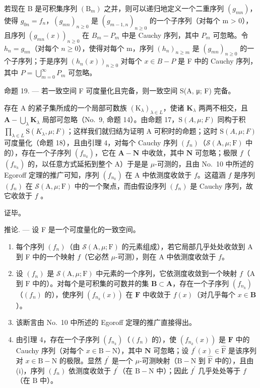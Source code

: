 若现在 B 是可积集序列 \((\mathrm{B}_{m})\) 之并，则可以递归地定义一个二重序列 \((g_{mn})\)，使得 \(g_{0n} = f_{n}\)，\((g_{mn})_{n \geqslant 0}\) 是 \((g_{m-1,n})_{n \geqslant 0}\) 的一个子序列（对每个 m \textgreater{} 0），且序列 \((g_{mn}(x))_{n \geqslant 0}\) 在 \(B_{m} - P_{m}\) 中是 Cauchy 序列，其中 \(P_{m}\) 可忽略。令 \(h_{n} = g_{nn}\)（对每个 \(n \geqslant 0\)），使得对每个 m，序列 \((h_{n})_{n \geqslant m}\) 是 \((g_{mn})_{n \geqslant 0}\) 的一个子序列；于是序列 \((h_{n}(x))_{n \geqslant 0}\) 对每个 \(x \in B - P\) 是 F 中的 Cauchy 序列，其中 \(P = \bigcup_{m=0}^{\infty} P_{m}\) 可忽略。

命题 19. --- 若一致空间 F 可度量化且完备，则一致空间 S(A, μ; F) 完备。

存在 A 的紧子集所成的一个局部可数族 \((\mathrm{K}_{\lambda})_{\lambda \in L}\)，使诸 \(\mathbf{K}_{\lambda}\) 两两不相交，且 \(\mathbf{A} - \bigcup_{\lambda}\mathbf{K}_{\lambda}\) 局部可忽略（No.~9, 命题 14）。由命题 17，\(\mathrm{S}(A,\mu;F)\) 同构于积 \(\prod_{\lambda \in L}\mathrm{S}(K_{\lambda},\mu;F)\)；这样我们就归结为证明 A 可积时的命题；这时 \(\mathrm{S}(A,\mu;F)\) 可度量化（命题 18），且由引理 4，对每个 Cauchy 序列 \((f_n)\)（\(\mathcal{S}(\mathrm{A},\mu;\mathrm{F})\) 中的），存在一个子序列 \((f_{n_k})\)，它在 \(\mathbf{A} - \mathbf{N}\) 中收敛，其中 \(\mathbf{N}\) 可忽略；极限 \(f\)（\((f_{n_k})\) 的，以任意方式延拓到整个 A）于是是 \(\mu\)-可测的，且由 No.~10 中所述的 Egoroff 定理的推广可知，序列 \((f_{n_k})\) 在 A 中依测度收敛于 \(f\)。这蕴涵 \(f\) 是序列 \((f_n)\) 在 \(\mathcal{S}(\mathrm{A},\mu;\mathrm{F})\) 中的一个聚点，而由假设序列 \((f_n)\) 是 Cauchy 序列，故它收敛于 \(f\) 。

证毕。

推论. --- 设 F 是一个可度量化的一致空间。

\begin{enumerate}
\def\labelenumi{(\roman{enumi})}
\item
  每个序列 \((f_n)\)（由 \(\mathcal{S}(\mathrm{A},\mu ;\mathrm{F})\) 的元素组成），若它局部几乎处处收敛到 A 到 F 中的一个映射 \(f\)（它必然 \(\mu\)-可测），则在 A 中依测度收敛于 \(f\)。
\item
  设 \((f_n)\) 是 \(\mathcal{S}(\mathrm{A},\mu ;\mathrm{F})\) 中元素的一个序列，它依测度收敛到一个映射 \(f\)（\(\mathrm{A}\) 到 \(\mathrm{F}\) 中的）。对每个是可积集的可数并的集 \(\mathbf{B}\subset \mathbf{A}\)，存在一个子序列 \((f_{n_k})\)（\((f_n)\) 的），使序列 \((f_{n_k}(x))\) 在 \(\mathbf{F}\) 中收敛于 \(f(x)\)（对几乎每个 \(x\in \mathbf{B}\)）。
\setcounter{enumi}{0}
\item
  该断言由 No.~10 中所述的 Egoroff 定理的推广直接得出。
\item
  由引理 4，存在一个子序列 \((f_{n_k})\)（\((f_n)\) 的），使 \((f_{n_k}(x))\) 是 \(\mathbf{F}\) 中的 Cauchy 序列（对每个 \(x\in \mathrm{B} - \mathrm{N}\)），其中 \(\mathbf{N}\) 可忽略；设 \(f^{\prime}(x)\in \widehat{\mathrm{F}}\) 是该序列对 \(x\in \mathrm{B} - \mathrm{N}\) 的极限。显然 \(f^{\prime}\) 是一个 \(\mu\)-可测映射（\(\mathrm{B} - \mathrm{N}\) 到 \(\widehat{\mathrm{F}}\) 中的），且由 (i)，序列 \((f_n)\) 依测度收敛于 \(f^{\prime}\)（在 \(\mathrm{B} - \mathrm{N}\) 中）；因此 \(f^{\prime}\) 几乎处处等于 \(f\)（在 \(\mathrm{B}\) 中）。
\end{enumerate}

